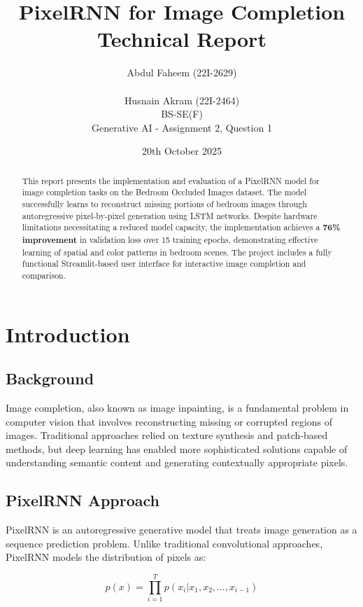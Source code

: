 \documentclass[12pt,a4paper]{article}
\title{\textbf{PixelRNN for Image Completion}\\
\large Technical Report}
\author{Abdul Faheem (22I-2629)\\ \\
Husnain Akram (22I-2464)\\
BS-SE(F)\\
Generative AI - Assignment 2, Question 1}
\date{20th October 2025}
\begin{document}
\maketitle

\begin{abstract}
This report presents the implementation and evaluation of a PixelRNN model for image completion tasks on the Bedroom Occluded Images dataset. The model successfully learns to reconstruct missing portions of bedroom images through autoregressive pixel-by-pixel generation using LSTM networks. Despite hardware limitations necessitating a reduced model capacity, the implementation achieves a \textbf{76\% improvement} in validation loss over 15 training epochs, demonstrating effective learning of spatial and color patterns in bedroom scenes. The project includes a fully functional Streamlit-based user interface for interactive image completion and comparison.
\end{abstract}

\tableofcontents
\newpage

\section{Introduction}

\subsection{Background}

Image completion, also known as image inpainting, is a fundamental problem in computer vision that involves reconstructing missing or corrupted regions of images. Traditional approaches relied on texture synthesis and patch-based methods, but deep learning has enabled more sophisticated solutions capable of understanding semantic content and generating contextually appropriate pixels.

\subsection{PixelRNN Approach}

PixelRNN \cite{pixelrnn} is an autoregressive generative model that treats image generation as a sequence prediction problem. Unlike traditional convolutional approaches, PixelRNN models the distribution of pixels as:

\begin{equation}
p(x) = \prod_{i=1}^{T} p(x_i | x_1, x_2, \ldots, x_{i-1})
\end{equation}
\end{document}
